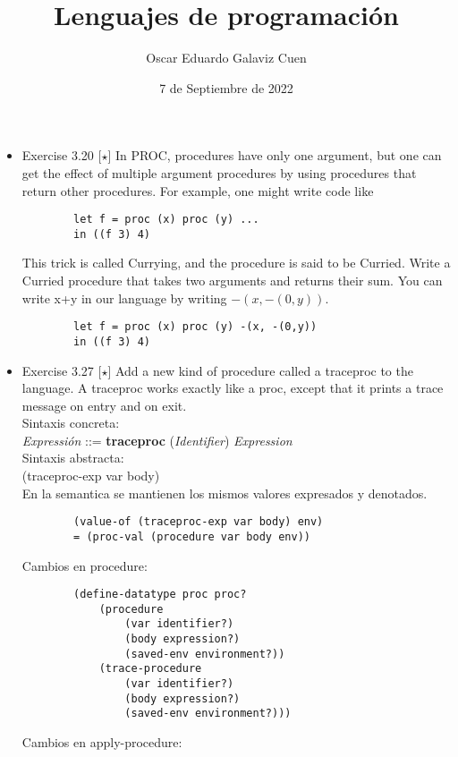 \documentclass{article}
\title{Lenguajes de programación}
\author{Oscar Eduardo Galaviz Cuen}
\date{7 de Septiembre de 2022}
\begin{document}
\maketitle
\begin{itemize}
    
    \item{Exercise 3.20  [$\star$] In PROC, procedures have only one argument, but one can get the effect of multiple argument procedures by using procedures that return other procedures. For example, one might write code like
    \begin{Verbatim}
        let f = proc (x) proc (y) ...
        in ((f 3) 4)
    \end{Verbatim}
    This trick is called Currying, and the procedure is said to be Curried. Write a Curried procedure that takes two arguments and returns their sum.  You can write x+y in our language by writing $-(x,-(0,y))$.}
    \begin{Verbatim}
        let f = proc (x) proc (y) -(x, -(0,y))
        in ((f 3) 4)
    \end{Verbatim}
    \item{Exercise 3.27 [$\star$]  Add a new kind of procedure called a traceproc to the language. A traceproc works exactly like a proc,  except that  it  prints a  trace  message on entry and on exit.\\}
    Sintaxis concreta:\\
    \textit{Expressión} ::= \textbf{traceproc} (\textit{Identifier}) \textit{Expression}\\
    Sintaxis abstracta:\\
    (traceproc-exp var body)\\
    En la semantica se mantienen los mismos valores expresados y denotados.
    \begin{Verbatim}
        (value-of (traceproc-exp var body) env)
        = (proc-val (procedure var body env))
    \end{Verbatim}
    Cambios en procedure:
    \begin{verbatim}
        (define-datatype proc proc?
            (procedure
                (var identifier?)
                (body expression?)
                (saved-env environment?))
            (trace-procedure
                (var identifier?)
                (body expression?)
                (saved-env environment?)))
    \end{verbatim}
    Cambios en apply-procedure:\\
    \begin{Verbatim}

\end{Verbatim}
\end{itemize}
\end{document}
